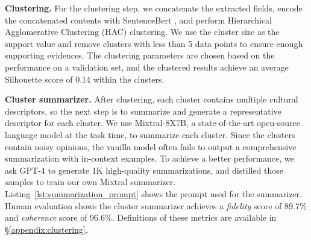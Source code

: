 \documentclass{article} %
\begin{document}
\noindent\textbf{Clustering.}
For the clustering step, we concatenate the extracted fields, encode the concatenated contents with SentenceBert \citep{reimers2019sentence}, and perform Hierarchical Agglomerative Clustering (HAC) clustering. %
We use the cluster size as the support value and remove clusters with less than 5 data points to ensure enough supporting evidences. 
The clustering parameters are chosen based on the performance on a validation set, and the clustered results achieve an average Silhouette score of 0.14 within the clusters. %

\noindent\textbf{Cluster summarizer.}
After clustering, each cluster contains multiple cultural descriptors, so the next step is to summarize and generate a representative descriptor for each cluster. We use Mixtral-8X7B\citep{jiang2024mixtral}, a state-of-the-art open-source language model at the task time, to summarize each cluster. Since the clusters contain noisy opinions, the vanilla model often fails to output a comprehensive summarization with in-context examples. To achieve a better performance, we ask GPT-4 to generate 1K high-quality summarizations, and distilled those samples to train our own Mixtral summarizer.  %
Listing~\ref{lst:summarization_prompt} shows the prompt used for the summarizer. Human evaluation shows the cluster summarizer achieves a \textit{fidelity} score of 89.7\% and \textit{coherence} score of 96.6\%. Definitions of these metrics are available in \S\ref{appendix:clustering}.

\end{document}
